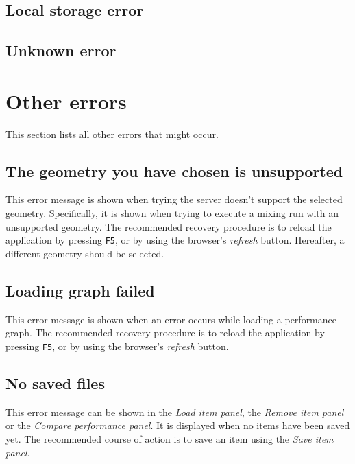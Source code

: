 \subsection{Local storage error}

\subsection{Unknown error}

\section{Other errors}
This section lists all other errors that might occur.

\subsection{The geometry you have chosen is unsupported}
This error message is shown when trying the server doesn't support the selected geometry. Specifically, it is shown when trying to execute a mixing run with an unsupported geometry. The recommended recovery procedure is to reload the application by pressing \texttt{F5}, or by using the browser's \emph{refresh} button. Hereafter, a different geometry should be selected.

\subsection{Loading graph failed}
This error message is shown when an error occurs while loading a performance graph. The recommended recovery procedure is to reload the application by pressing \texttt{F5}, or by using the browser's \emph{refresh} button.

\subsection{No saved files}
This error message can be shown in the \emph{Load item panel}, the \emph{Remove item panel} or the \emph{Compare performance panel}. It is displayed when no items have been saved yet. The recommended course of action is to save an item using the \emph{Save item panel}.




